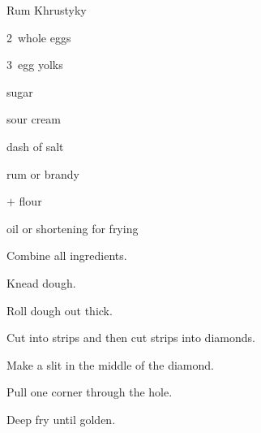 \begin{recipe}{Rum Khrustyky}{}{}

\begin{ingredients}
\item 2~whole eggs
\item 3~egg yolks
\item {} sugar
\item {} sour cream
\item dash of salt
\item {} rum or brandy
\item {}$+$ flour
\item oil or shortening for frying
\end{ingredients}

\begin{directions}
\item Combine all ingredients.
\item Knead dough.
\item Roll dough out \inch{\eighth} thick.
\item Cut into strips and then cut strips into diamonds.
\item Make a slit in the middle of the diamond.
\item Pull one corner through the hole.
\item Deep fry until golden.
\end{directions}

\end{recipe}
